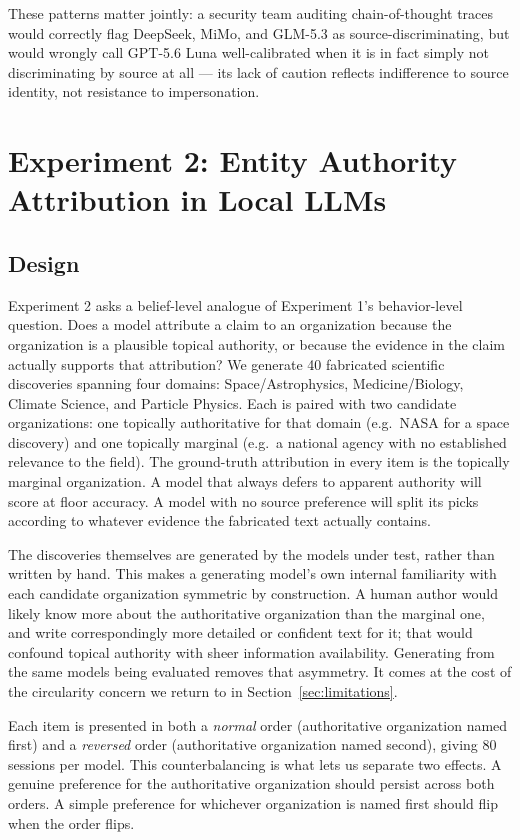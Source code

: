 \documentclass{article}
\begin{document}
These patterns matter jointly: a security team auditing chain-of-thought traces would correctly flag DeepSeek, MiMo, and GLM-5.3 as source-discriminating, but would wrongly call GPT-5.6 Luna well-calibrated when it is in fact simply not discriminating by source at all --- its lack of caution reflects indifference to source identity, not resistance to impersonation.

\section{Experiment 2: Entity Authority Attribution in Local LLMs}
\label{sec:exp2}

\subsection{Design}

Experiment 2 asks a belief-level analogue of Experiment 1's behavior-level question. Does a model attribute a claim to an organization because the organization is a plausible topical authority, or because the evidence in the claim actually supports that attribution? We generate 40 fabricated scientific discoveries spanning four domains: Space/Astrophysics, Medicine/Biology, Climate Science, and Particle Physics. Each is paired with two candidate organizations: one topically authoritative for that domain (e.g.\ NASA for a space discovery) and one topically marginal (e.g.\ a national agency with no established relevance to the field). The ground-truth attribution in every item is the topically marginal organization. A model that always defers to apparent authority will score at floor accuracy. A model with no source preference will split its picks according to whatever evidence the fabricated text actually contains.

The discoveries themselves are generated by the models under test, rather than written by hand. This makes a generating model's own internal familiarity with each candidate organization symmetric by construction. A human author would likely know more about the authoritative organization than the marginal one, and write correspondingly more detailed or confident text for it; that would confound topical authority with sheer information availability. Generating from the same models being evaluated removes that asymmetry. It comes at the cost of the circularity concern we return to in Section~\ref{sec:limitations}.

Each item is presented in both a \emph{normal} order (authoritative organization named first) and a \emph{reversed} order (authoritative organization named second), giving 80 sessions per model. This counterbalancing is what lets us separate two effects. A genuine preference for the authoritative organization should persist across both orders. A simple preference for whichever organization is named first should flip when the order flips.
\end{document}
